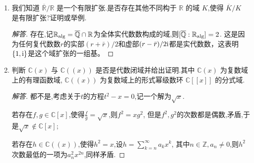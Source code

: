 \begin{enumerate}
\begin{proof}
\begin{enumerate}[label=(\arabic*)]
        \item 容易说明$\sigma(g(x))=g(x)^p$是$\mathbb{F}_p[x]$上保持$\mathbb{F}_p$的加法群同态，
        因此$\mathbb{F}_p[x]$上的$p$次方就是逐单项进行$p$次方，且系数不变。
        \item 设$\varPhi_n(x)=f(x)g(x)$，由于$\varPhi_n(\zeta^p)=0$，如果$f(\zeta^p)\ne0$的话就有$g(\zeta^p)=0$。
        由于$f$不可约可知$f(x) \mid g(x^p)$，从而$\bar{f}(x)\mid\bar{g}(x^p)$，由(1)得出$\bar{f}(x)\mid\bar{g}(x)^p$。
        设$\bar{q}(x)$是$\bar{f}(x)$的一个不可约因子，则其亦是$\bar{g}(x)$的因子，
        从而$\bar{q}(x)^2\mid\bar{\varPhi_n}(x)$，更加整除$\overline{x^n-1}$。
        这表明$\overline{x^n-1}$在$\bar{q}(x)$的分裂域中有重根，而本节例4说$p \mid n$时这才会发生，同题设矛盾。
        \item 设$f(x)$是$\varPhi_n(x)$的首一不可约因子，$n$次本原单位根$\zeta$是其根。
        注意到$\varPhi_n(x)$的每个根都是$\zeta^d$的形式，其中$(d,n)=1$。
        记$d$的素因数分解为$p_1p_2 \cdots p_r$，由(2)可知$\zeta^{p_1}$也是$f(x)$的根，
        进而$(\zeta^{p_1})^{p_2}$亦然，重复这个过程最终得到$\zeta^d$是$f(x)$的根，这说明$f(x)=\varPhi_n(x)$。\qedhere
    \end{enumerate}
\end{proof}

\item 我们知道 $ \overline{\mathbb{R}}/\mathbb{R} $ 是一个有限扩张.是否存在其他不同构于 $ \mathbb{R} $ 的域 $ K $,使得 $ \overline{K}/K $ 是有限扩张?证明或举例.
\begin{proof}[解答]
    存在,记$\mathbb{R}_{\rm alg}=\overline{\mathbb{Q}}\cap\mathbb{R}$为全体实代数数构成的域,则$[\overline{\mathbb{Q}}:\mathbb{R}_{\rm alg}]=2$.
    这是因为任何复代数数$r$的实部$(r+\bar{r})/2$和虚部$(r-\bar{r})/2{\rm i}$都是实代数数，这表明$\{1,{\rm i}\}$是这个域扩张的一组基。
\end{proof}

\item 判断 $ \mathbb{C}(x) $ 与 $ \mathbb{C}((x)) $ 是否是代数闭域并给出证明.其中 $ \mathbb{C}(x) $ 为复数域上的有理函数域, $ \mathbb{C}((x)) $ 为复数域上的形式幂级数环 $ \mathbb{C}[[x]] $ 的分式域.
\begin{proof}[解答]
    都不是,考虑关于$t$的方程$t^2-x=0$,记一个解为$\sqrt{x}$.
    
    若存在$f,g\in \mathbb{C}[x]$,使得$\frac{f}{g}=\sqrt{x}$,则$f^2=xg^2$,
    但是$f^2,g^2$的次数都是偶数,矛盾,于是$\sqrt{x}\notin\mathbb{C}[x]$;

    若存在$h\in\mathbb{C}((x))$,使得$h^2=x$,设$h=\sum\limits_{k=n}^{\infty}a_kx^k$,
    其中$n\in\mathbb{Z},a_n\ne0$,则$h^2$次数最低的一项为$a_n^2x^{2n}$,同样矛盾.
\end{proof}


\end{enumerate}
